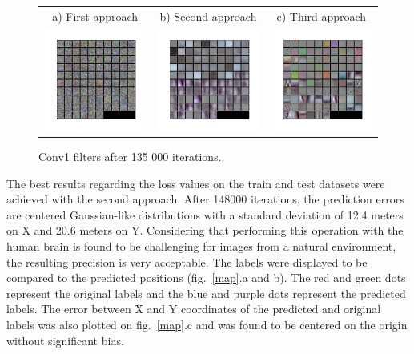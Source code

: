 \begin{figure}[htb]
\centering
\begin{tabular}{ccc}
    a) First approach & b) Second approach & c) Third approach \\
    \includegraphics[width=0.3\linewidth]{images/regression/conv1_26_135000}&
    \includegraphics[width=0.3\linewidth]{images/regression/conv1_37_135000}&
    \includegraphics[width=0.3\linewidth]{images/regression/conv1_30_135000}\\
\end{tabular}
\caption{Conv1 filters after 135 000 iterations.}
\label{1appfilter}
\label{2appfilter}
\label{3appfilter}
\end{figure}

The best results regarding the loss values on the train and test datasets were achieved with the second approach. After 148000 iterations, the prediction errors are centered Gaussian-like distributions with a standard deviation of 12.4 meters on X and 20.6 meters on Y. Considering that performing this operation with the human brain is found to be challenging for images from a natural environment, the resulting precision is very acceptable. The labels were displayed to be compared to the predicted positions (fig.~\ref{map}.a and b). The red and green dots represent the original labels and the blue and purple dots represent the predicted labels. The error between X and Y coordinates of the predicted and original labels was also plotted on fig.~\ref{map}.c and was found to be centered on the origin without significant bias.

